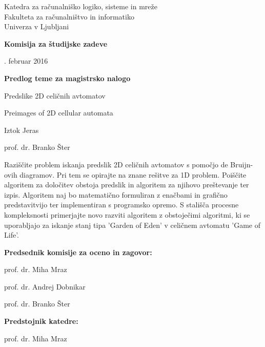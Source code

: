 \documentclass[a4paper, 12pt]{article}
\begin{document}
\noindent
Katedra za računalniško logiko, sisteme in mreže \\
Fakulteta za računalništvo in informatiko \\
Univerza v Ljubljani

\bigskip
{\bf Komisija za študijske zadeve}

. februar 2016

\bigskip
\begin{center}
{\Large\bf Predlog teme za magistrsko nalogo}
\end{center}

\begin{description}[align=left,labelwidth=3cm,noitemsep,nolistsep]
\item [Naslov:]   Predslike 2D celičnih avtomatov
\item [Title:]    Preimages of 2D cellular automata
\\
\item [Kandidat:] Iztok Jeras
\\
\item [Mentor:]   prof. dr. Branko Šter
\\
\item [Tema naloge:] Raziščite problem iskanja predslik 2D celičnih avtomatov s pomočjo de
Bruijn-ovih diagramov. Pri tem se opirajte na znane rešitve za 1D problem. Poiščite algoritem
za določitev obstoja predslik in algoritem za njihovo preštevanje ter izpis. Algoritem
naj bo matematično formuliran z enačbami in grafično predstavitvijo ter implementiran
s programsko opremo. S stališča procesne kompleksnosti primerjajte novo razviti
algoritem z obstoječimi algoritmi, ki se uporabljajo za iskanje stanj tipa 'Garden of Eden' 
v celičnem avtomatu 'Game of Life'.
\end{description}

{\bf Predsednik komisije za oceno in zagovor:}
\begin{description}[align=left,labelwidth=3cm,noitemsep,nolistsep]
\item [Predsednik:] prof. dr. Miha Mraz

\item [Člani:]      prof. dr. Andrej Dobnikar
\item []            prof. dr. Branko Šter
\end{description}

\bigskip
{\bf Predstojnik katedre:}

\bigskip
prof. dr. Miha Mraz

\clearpage
\end{document}
